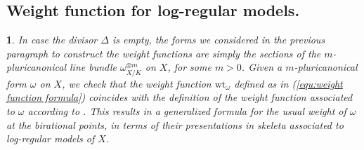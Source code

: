\documentclass{amsart}%
\numberwithin{equation}{subsection}
\theoremstyle{plain2}
\theoremstyle{definition2}
\theoremstyle{stepstyle}
\theoremstyle{point}
\theoremstyle{subpoint}
\newtheorem{subpoint}[equation]{}%
\newcommand{\spa}[1]{\begin{subpoint}#1\end{subpoint}}           %
\newcommand{\cY}{\ensuremath{\mathscr{Y}}}
\renewcommand{\cY}{\ensuremath{\mathscr{Y}}}
\newcommand{\divisor}{\mathrm{div}}
\newcommand{\weight}{\mathrm{wt}}
\newcommand{\Sk}{\mathrm{Sk}}
\begin{document}
\subsection{Weight function for log-regular models.}
\spa{In case the divisor $\Delta$ is empty, the forms we considered in the previous paragraph to construct the weight functions are simply the sections of the $m$-pluricanonical line bundle $\omega_{X/K}^{\otimes m}$ on $X$, for some $m>0$. Given a $m$-pluricanonical form $\omega$ on $X$, we check that the weight function $\weight_{\omega}$ defined as in (\ref{equ:weight function formula}) coincides with the definition of the weight function associated to $\omega$ according to \cite{MustataNicaise}. This results in a generalized formula for the usual weight of $\omega$ at the birational points, in terms of their presentations in skeleta associated to log-regular models of $X$.}

\end{document}
